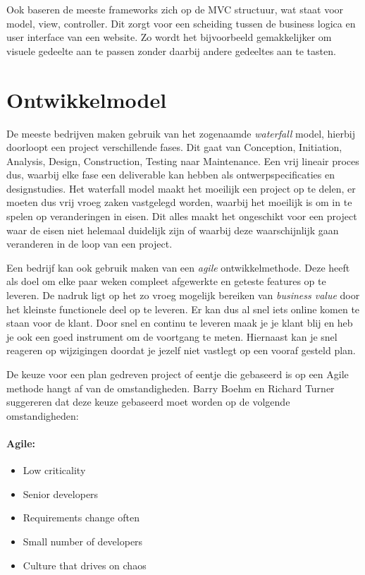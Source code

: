 \documentclass[12pt, a4paper]{article}
\begin{document}
Ook baseren de meeste frameworks zich op de MVC structuur, wat staat voor model, view, controller. Dit zorgt voor een scheiding tussen de business logica en user interface van een website. Zo wordt het bijvoorbeeld gemakkelijker om visuele gedeelte aan te passen zonder daarbij andere gedeeltes aan te tasten.

\section{Ontwikkelmodel}

De meeste bedrijven maken gebruik van het zogenaamde \emph{waterfall} model, hierbij doorloopt een project verschillende fases. Dit gaat van Conception, Initiation, Analysis, Design, Construction, Testing naar Maintenance. Een vrij lineair proces dus, waarbij elke fase een deliverable kan hebben als ontwerpspecificaties en designstudies. Het waterfall model maakt het moeilijk een project op te delen, er moeten dus vrij vroeg zaken vastgelegd worden, waarbij het moeilijk is om in te spelen op veranderingen in eisen. Dit alles maakt het ongeschikt voor een project waar de eisen niet helemaal duidelijk zijn of waarbij deze waarschijnlijk gaan veranderen in de loop van een project.

Een bedrijf kan ook gebruik maken van een \emph{agile} ontwikkelmethode. Deze heeft als doel om elke paar weken compleet afgewerkte en geteste features op te leveren. De nadruk ligt op het zo vroeg mogelijk bereiken van \emph{business value} door het kleinste functionele deel op te leveren. Er kan dus al snel iets online komen te staan voor de klant. Door snel en continu te leveren maak je je klant blij en heb je ook een goed instrument om de voortgang te meten. Hiernaast kan je snel reageren op wijzigingen doordat je jezelf niet vastlegt op een vooraf gesteld plan.

De keuze voor een plan gedreven project of eentje die gebaseerd is op een Agile methode hangt af van de omstandigheden. Barry Boehm en Richard Turner\cite{agilebook} suggereren dat deze keuze gebaseerd moet worden op de volgende omstandigheden:

\paragraph{Agile:}
\begin{itemize}
  \item Low criticality
  \item Senior developers
  \item Requirements change often
  \item Small number of developers
  \item Culture that drives on chaos
\end{itemize}
\end{document}
